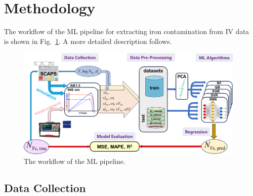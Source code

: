 \documentclass[a4paper,fleqn,draft]{cas-sc}
\begin{document}
\section{Methodology}
The workflow of the ML pipeline for extracting iron contamination from IV data is shown in Fig.~\ref{fig1}.
 A more detailed description follows.

\begin{figure}
	\centering
		\includegraphics[width=0.9\linewidth]{Fig1.png}
	  \caption{The workflow of the ML pipeline.}\label{fig1}
\end{figure}


\subsection{Data Collection}\label{SecDataCol}
\end{document}
